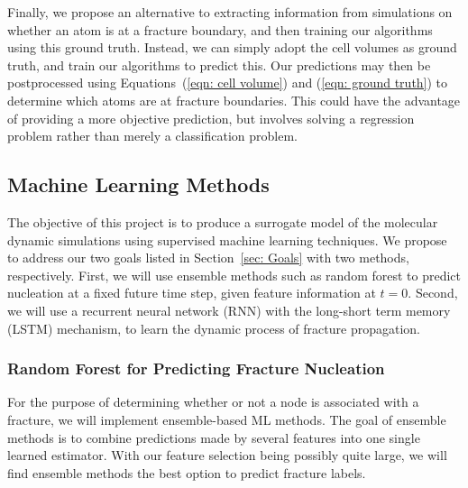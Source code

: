 Finally, we propose an alternative to extracting information from simulations on whether an atom is at a fracture boundary, and then training our algorithms using this ground truth.  Instead, we can simply adopt the cell volumes as ground truth, and train our algorithms to predict this.  Our predictions may then be postprocessed using Equations~(\ref{eqn: cell volume}) and (\ref{eqn: ground truth}) to determine which atoms are at fracture boundaries.  This could have the advantage of providing a more objective prediction, but involves solving a regression problem rather than merely a classification problem.

\subsection{Machine Learning Methods}

The objective of this project is to produce a surrogate model of the molecular dynamic simulations using supervised machine learning techniques. We propose to address our two goals listed in Section~\ref{sec: Goals} with two methods, respectively. First, we will use ensemble methods such as random forest to predict nucleation at a fixed future time step, given feature information at $t=0$.
Second, we will use a recurrent neural network (RNN) with the long-short term memory (LSTM) mechanism, to learn the dynamic process of fracture propagation. %

\subsubsection{Random Forest for Predicting Fracture Nucleation}

For the purpose of determining whether or not a node is associated with a fracture, we will implement ensemble-based ML methods. The goal of ensemble methods is to combine predictions made by several features into one single learned estimator. With our feature selection being possibly quite large, we will find ensemble methods the best option to predict fracture labels. 

